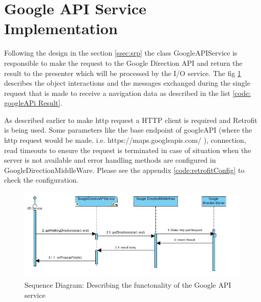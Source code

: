 \newpage
\section{Google API Service Implementation}
    Following the design in the section \ref{ssec:srp} the class 
    GoogleAPIService is responsible to make the request to the Google
    Direction API and return the result to the presenter which will be
    processed by the I/O service. The fig \ref{fig:directionServiceSeqDiagram}
    describes the object interactions and the messages exchanged during the
    single request that is made to receive a navigation data as described in
    the list \ref{code: googleAPi Result}.
    \par
        As described earlier to make http request a HTTP client is required and Retrofit
        is being used. Some parameters like the base endpoint of googleAPI (where the http
        request would be made. i.e. https://maps.googleapis.com/ ), connection, read timeouts
        to ensure the request is terminated 
        in case of situation when the server is not available 
        and error handling methods are configured in 
        GoogleDirectionMiddleWare. Please see the appendix 
        \ref{code:retrofitConfig} to check the configuration.        

    \begin{figure}[htbp!]
        \centering \includegraphics[scale=0.75]{grafiken/seqDigGoogleAPI.jpg}
        \caption{Sequence Diagram: Describing the functonality of the Google API service}
        \label{fig:directionServiceSeqDiagram}
    \end{figure}